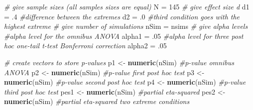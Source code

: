 \documentclass[
]{book}
\newenvironment{Shaded}{\begin{snugshade}}{\end{snugshade}}
\newcommand{\CommentTok}[1]{\textcolor[rgb]{0.56,0.35,0.01}{\textit{#1}}}
\newcommand{\DecValTok}[1]{\textcolor[rgb]{0.00,0.00,0.81}{#1}}
\newcommand{\FloatTok}[1]{\textcolor[rgb]{0.00,0.00,0.81}{#1}}
\newcommand{\KeywordTok}[1]{\textcolor[rgb]{0.13,0.29,0.53}{\textbf{#1}}}
\newcommand{\NormalTok}[1]{#1}
\newcommand{\StringTok}[1]{\textcolor[rgb]{0.31,0.60,0.02}{#1}}
\begin{document}
\begin{Shaded}
\begin{Highlighting}[]
\CommentTok{# give sample sizes (all samples sizes are equal)}
\NormalTok{N =}\StringTok{ }\DecValTok{145}
\CommentTok{# give effect size d}
\NormalTok{d1 =}\StringTok{ }\FloatTok{.4} \CommentTok{#difference between the extremes}
\NormalTok{d2 =}\StringTok{ }\FloatTok{.0} \CommentTok{#third condition goes with the highest extreme}
\CommentTok{# give number of simulations}
\NormalTok{nSim =}\StringTok{ }\NormalTok{nsims}
\CommentTok{# give alpha levels}
\CommentTok{#alpha level for the omnibus ANOVA}
\NormalTok{alpha1 =}\StringTok{ }\FloatTok{.05} 
\CommentTok{#alpha level for three post hoc one-tail t-test Bonferroni correction}
\NormalTok{alpha2 =}\StringTok{ }\FloatTok{.05} 
\end{Highlighting}
\end{Shaded}

\begin{Shaded}
\begin{Highlighting}[]
\CommentTok{# create vectors to store p-values}
\NormalTok{p1 <-}\StringTok{ }\KeywordTok{numeric}\NormalTok{(nSim) }\CommentTok{#p-value omnibus ANOVA}
\NormalTok{p2 <-}\StringTok{ }\KeywordTok{numeric}\NormalTok{(nSim) }\CommentTok{#p-value first post hoc test}
\NormalTok{p3 <-}\StringTok{ }\KeywordTok{numeric}\NormalTok{(nSim) }\CommentTok{#p-value second post hoc test}
\NormalTok{p4 <-}\StringTok{ }\KeywordTok{numeric}\NormalTok{(nSim) }\CommentTok{#p-value third post hoc test}
\NormalTok{pes1 <-}\StringTok{ }\KeywordTok{numeric}\NormalTok{(nSim) }\CommentTok{#partial eta-squared}
\NormalTok{pes2 <-}\StringTok{ }\KeywordTok{numeric}\NormalTok{(nSim) }\CommentTok{#partial eta-squared two extreme conditions}
\end{Highlighting}
\end{Shaded}
\end{document}
